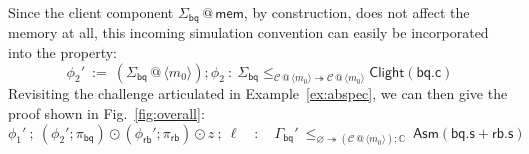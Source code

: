 \documentclass[acmsmall,screen,review,anonymous]{acmart}
\newcommand{\kw}[1]{\ensuremath{ \mathsf{#1} }}
\begin{document}
\begin{example}
Since the client component
$\Sigma_\kw{bq} \mathbin@ \kw{mem}$,
by construction,
does not affect the memory at all,
this incoming simulation convention
can easily be incorporated into the property:
\[
  \phi_2' \: := \:
    (\Sigma_\kw{bq} \mathbin@ \langle m_0 \rangle)
    \mathbin;
    \phi_2
  \: : \:
  \Sigma_\kw{bq}
    \le_{\mathcal{C} \mathbin@ \langle m_0 \rangle
         \twoheadrightarrow
         \mathcal{C} \mathbin@ \langle m_0 \rangle}
    \kw{Clight}(\kw{bq.c})
\]
Revisiting the challenge articulated in Example~\ref{ex:abspec},
we can then give the proof shown in Fig.~\ref{fig:overall}:
\[
  \phi_1'
  \:\mathbin;\:
  (\phi_2' \mathbin; \pi_\kw{bq}) \odot
  (\phi_\kw{rb}' \mathbin; \pi_\kw{rb}) \odot z
  \:\mathbin;\:
  \ell
  \quad : \quad
  \Gamma_\kw{bq}'
  \:
  \le_{\varnothing \twoheadrightarrow
       (\mathcal{C} \mathbin@ \langle m_0 \rangle) \mathbin; \mathbb{C}}
  \:
  \kw{Asm}(\kw{bq.s} + \kw{rb.s})
\]
\end{example}
\end{document}

